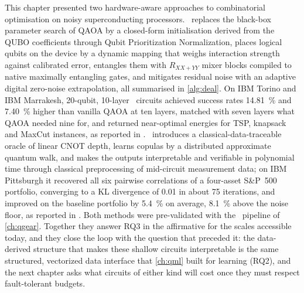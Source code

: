 This chapter presented two hardware-aware approaches to combinatorial optimisation on noisy superconducting processors. \deal\ replaces the black-box parameter search of QAOA by a closed-form initialisation derived from the QUBO coefficients through Qubit Prioritization Normalization, places logical qubits on the device by a dynamic mapping that weighs interaction strength against calibrated error, entangles them with $R_{XX+YY}$ mixer blocks compiled to native maximally entangling gates, and mitigates residual noise with an adaptive digital zero-noise extrapolation, all summarised in \cref{alg:deal}. On IBM Torino and IBM Marrakesh, 20-qubit, 10-layer \deal\ circuits achieved success rates \SI{14.81}{\percent} and \SI{7.40}{\percent} higher than vanilla QAOA at ten layers, matched with seven layers what QAOA needed nine for, and returned near-optimal energies for TSP, knapsack and MaxCut instances, as reported in \cite{guo2025deal}. \qawa\ introduces a classical-data-traceable oracle of linear CNOT depth, learns copulas by a distributed approximate quantum walk, and makes the outputs interpretable and verifiable in polynomial time through classical preprocessing of mid-circuit measurement data; on IBM Pittsburgh it recovered all six pairwise correlations of a four-asset S\&P~500 portfolio, converging to a KL divergence of 0.01 in about 75 iterations, and improved on the baseline portfolio by \SI{5.4}{\percent} on average, \SI{8.1}{\percent} above the noise floor, as reported in \cite{guo2025qawa}. Both methods were pre-validated with the \qgear\ pipeline of \cref{ch:qgear}. Together they answer RQ3 in the affirmative for the scales accessible today, and they close the loop with the question that preceded it: the data-derived structure that makes these shallow circuits interpretable is the same structured, vectorized data interface that \cref{ch:qml} built for learning (RQ2), and the next chapter asks what circuits of either kind will cost once they must respect fault-tolerant budgets.
